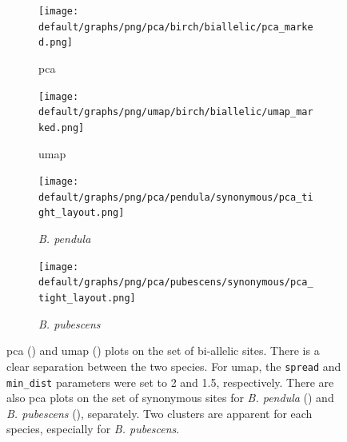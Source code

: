 \documentclass[hidelinks,11pt]{article}
\newcommand{\pendula}{\textit{B. pendula}}
\newcommand{\pubescens}{\textit{B. pubescens}}
\begin{document}
{    \begin{figure}[!htbp]
        \centering
        \begin{subfigure}[b]{0.48\textwidth}
            \centering
            \texttt{[image: default/graphs/png/pca/birch/biallelic/pca\_marked.png]}
            \caption{\acrshort{pca}}
            \label{fig:pca_pendula_pubescens}
        \end{subfigure}
        \hfill
        \begin{subfigure}[b]{0.49\textwidth}
            \centering
            \texttt{[image: default/graphs/png/umap/birch/biallelic/umap\_marked.png]}
            \caption{\acrshort{umap}}
            \label{fig:umap_pendula_pubescens}
        \end{subfigure}
        \par\bigskip
        \centering
        \begin{subfigure}[b]{0.492\textwidth}
            \centering
            \texttt{[image: default/graphs/png/pca/pendula/synonymous/pca\_tight\_layout.png]}
            \caption{\pendula{}}
            \label{fig:pca_synonymous_pendula}
        \end{subfigure}
        \hfill
        \begin{subfigure}[b]{0.49\textwidth}
            \centering
            \texttt{[image: default/graphs/png/pca/pubescens/synonymous/pca\_tight\_layout.png]}
            \caption{\pubescens{}}
            \label{fig:pca_synonymous_pubescens}
        \end{subfigure}
        \caption{\acrshort{pca} () and \acrshort{umap} () plots on the set of bi-allelic sites. There is a clear separation between the two species. For \acrshort{umap}, the \texttt{spread} and \texttt{min\_dist} parameters were set to 2 and 1.5, respectively. There are also \acrshort{pca} plots on the set of synonymous sites for \pendula{} () and \pubescens{} (), separately. Two clusters are apparent for each species, especially for \pubescens{}.}
        \label{fig:pca}
    \end{figure}

}
\end{document}
